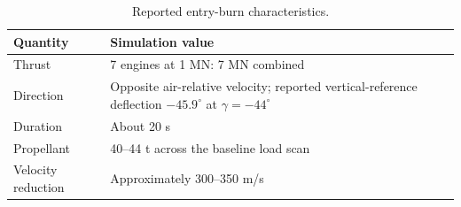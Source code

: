 \begin{table}[htbp]
\caption{Reported entry-burn characteristics.}
\label{tab:src7}
\small
\setlength{\tabcolsep}{3.5pt}
\begin{tabularx}{\linewidth}{@{}p{.22\linewidth}X@{}}
\toprule
Quantity & Simulation value \\
\midrule
Thrust & 7 engines at 1 MN: 7 MN combined \\
Direction & Opposite air-relative velocity; reported vertical-reference deflection $-45.9^\circ$ at $\gamma=-44^\circ$ \\
Duration & About 20 s \\
Propellant & 40--44 t across the baseline load scan \\
Velocity reduction & Approximately 300--350 m/s \\
\bottomrule
\end{tabularx}
\end{table}

